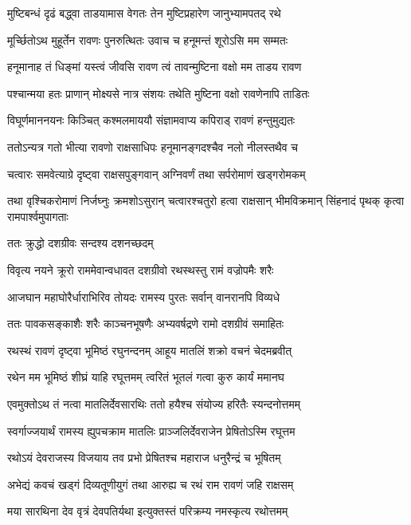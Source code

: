 \twolineshloka
{मुष्टिबन्धं दृढं बद्\mbox{}ध्वा ताडयामास वेगतः}
{तेन मुष्टिप्रहारेण जानुभ्यामपतद् रथे} %

\twolineshloka
{मूर्च्छितोऽथ मुहूर्तेन रावणः पुनरुत्थितः}
{उवाच च हनूमन्तं शूरोऽसि मम सम्मतः} %

\twolineshloka
{हनूमानाह तं धिङ्मां यस्त्वं जीवसि रावण}
{त्वं तावन्मुष्टिना वक्षो मम ताडय रावण} %

\twolineshloka
{पश्चान्मया हतः प्राणान् मोक्ष्यसे नात्र संशयः}
{तथेति मुष्टिना वक्षो रावणेनापि ताडितः} %

\twolineshloka
{विघूर्णमाननयनः किञ्चित् कश्मलमाययौ}
{संज्ञामवाप्य कपिराड् रावणं हन्तुमुद्यतः} %

\twolineshloka
{ततोऽन्यत्र गतो भीत्या रावणो राक्षसाधिपः}
{हनूमानङ्गदश्चैव नलो नीलस्तथैव च} %

\twolineshloka
{चत्वारः समवेत्याग्रे दृष्ट्वा राक्षसपुङ्गवान्}
{अग्निवर्णं तथा सर्परोमाणं खड्गरोमकम्} %

\threelineshloka
{तथा वृश्चिकरोमाणं निर्जघ्नुः क्रमशोऽसुरान्}
{चत्वारश्चतुरो हत्वा राक्षसान् भीमविक्रमान्}
{सिंहनादं पृथक् कृत्वा रामपार्श्वमुपागताः} %

\onelineshloka
{ततः क्रुद्धो दशग्रीवः सन्दश्य दशनच्छदम्} %

\twolineshloka
{विवृत्य नयने क्रूरो राममेवान्वधावत}
{दशग्रीवो रथस्थस्तु रामं वज्रोपमैः शरैः} %

\twolineshloka
{आजघान महाघोरैर्धाराभिरिव तोयदः}
{रामस्य पुरतः सर्वान् वानरानपि विव्यधे} %

\twolineshloka
{ततः पावकसङ्काशैः शरैः काञ्चनभूषणैः}
{अभ्यवर्षद्रणे रामो दशग्रीवं समाहितः} %

\twolineshloka
{रथस्थं रावणं दृष्ट्वा भूमिष्ठं रघुनन्दनम्}
{आहूय मातलिं शक्रो वचनं चेदमब्रवीत्} %

\twolineshloka
{रथेन मम भूमिष्ठं शीघ्रं याहि रघूत्तमम्}
{त्वरितं भूतलं गत्वा कुरु कार्यं ममानघ} %

\twolineshloka
{एवमुक्तोऽथ तं नत्वा मातलिर्देवसारथिः}
{ततो हयैश्च संयोज्य हरितैः स्यन्दनोत्तमम्} %

\twolineshloka
{स्वर्गाज्जयार्थं रामस्य ह्युपचक्राम मातलिः}
{प्राञ्जलिर्देवराजेन प्रेषितोऽस्मि रघूत्तम} %

\twolineshloka
{रथोऽयं देवराजस्य विजयाय तव प्रभो}
{प्रेषितश्च महाराज धनुरैन्द्रं च भूषितम्} %

\twolineshloka
{अभेद्यं कवचं खड्गं दिव्यतूणीयुगं तथा}
{आरुह्य च रथं राम रावणं जहि राक्षसम्} %

\twolineshloka
{मया सारथिना देव वृत्रं देवपतिर्यथा}
{इत्युक्तस्तं परिक्रम्य नमस्कृत्य रथोत्तमम्} %

